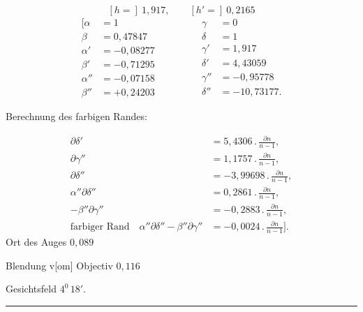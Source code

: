 \[
[h={}]\ 1{,}917,\qquad [h'={}]\ 0{,}2165
\]
\[
\begin{aligned}
[\alpha&=1\\
\beta&=0{,}47847\\
\alpha'&=-0{,}08277\\
\beta'&=-0{,}71295\\
\alpha''&=-0{,}07158\\
\beta''&=+0{,}24203
\end{aligned}\qquad\qquad
\begin{aligned}
\gamma&=0\\
\delta&=1\\
\gamma'&=1{,}917\\
\delta'&=4{,}43059\\
\gamma''&=-0{,}95778\\
\delta''&=-10{,}73177.
\end{aligned}
\]
\clearpage{}
\begin{center}Berechnung des farbigen Randes:\end{center}
\[
\begin{aligned}
\partial\delta'&=5{,}4306\mathbin{.}\frac{\partial n}{n-1},\\[4pt]
\partial\gamma''&=1{,}1757\mathbin{.}\frac{\partial n}{n-1},\\[4pt]
\partial\delta''&=-3{,}99698\mathbin{.}\frac{\partial n}{n-1},\\[4pt]
\alpha''\partial\delta''&=0{,}2861\mathbin{.}\frac{\partial n}{n-1},\\[4pt]
-\beta''\partial\gamma''&=-0{,}2883\mathbin{.}\frac{\partial n}{n-1},\\[4pt]
\text{farbiger Rand}\quad\alpha''\partial\delta''-\beta''\partial\gamma''&=-0{,}0024\mathbin{.}\frac{\partial n}{n-1}].
\end{aligned}
\]
\noindent\hspace*{\parindent}Ort des Auges $0{,}089$\par
\noindent\hspace*{\parindent}Blendung v[om] Objectiv $0{,}116$\par
\noindent\hspace*{\parindent}Gesichtsfeld $4^{0}\,18'$.
\begin{center}\rule{.25\linewidth}{.4pt}\end{center}
\clearpage\endgroup
